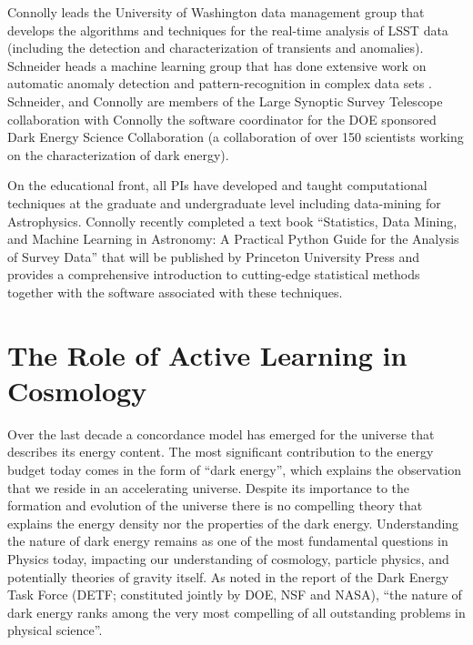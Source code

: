 \documentclass[prd,nofootbib,floatfix,11pt,tightenlines]{revtex4}
\begin{document}
Connolly leads the University of Washington data management group that
develops the algorithms and techniques for the real-time analysis of
LSST data (including the detection and characterization of
transients and anomalies).  Schneider heads a machine learning group
that has done extensive work on automatic anomaly detection and
pattern-recognition in complex data sets
\cite{Xiong2011gad,poczos12CVPR}.  Schneider, and Connolly are members
of the Large Synoptic Survey Telescope collaboration with Connolly the
software coordinator for the DOE sponsored Dark Energy Science
Collaboration (a collaboration of over 150 scientists working on the
characterization of dark energy).


On the educational front, all PIs have developed and taught computational techniques at the
graduate and undergraduate level including data-mining for
Astrophysics. Connolly recently completed a text book ``Statistics,
Data Mining, and Machine Learning in Astronomy: A Practical Python
Guide for the Analysis of Survey Data'' that will be published by
Princeton University Press and provides a comprehensive introduction
to cutting-edge statistical methods together with the software
associated with these techniques. 
%

\section{The Role of Active Learning in Cosmology}

Over the last decade a concordance model has emerged for the universe
that describes its energy content. The most significant contribution
to the energy budget today comes in the form of ``dark energy'', which
explains the observation that we reside in an accelerating
universe. Despite its importance to the formation and evolution of the
universe there is no compelling theory that explains the energy
density nor the properties of the dark energy. Understanding the
nature of dark energy remains as one of the most fundamental questions
in Physics today, impacting our understanding of cosmology, particle
physics, and potentially theories of gravity itself.  As noted in the 
report of the Dark Energy Task Force (DETF; constituted jointly by
DOE, NSF and NASA), ``the nature of dark energy ranks among the very
most compelling of all outstanding problems in physical science''.
\end{document}
